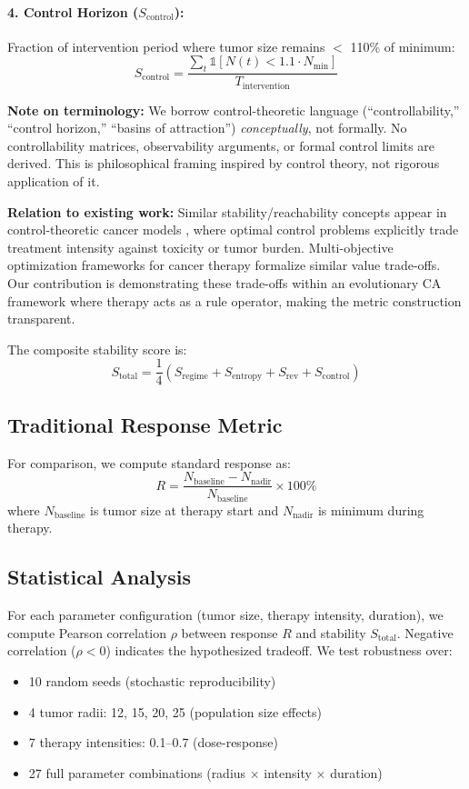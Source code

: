 \documentclass[11pt,a4paper]{article}
\begin{document}
\paragraph{4. Control Horizon ($S_{\text{control}}$):}
Fraction of intervention period where tumor size remains $<$ 110\% of minimum:
\[
S_{\text{control}} = \frac{\sum_t \mathbb{1}[N(t) < 1.1 \cdot N_{\text{min}}]}{T_{\text{intervention}}}
\]

\textbf{Note on terminology:} We borrow control-theoretic language (``controllability,'' ``control horizon,'' ``basins of attraction'') \textit{conceptually}, not formally. No controllability matrices, observability arguments, or formal control limits are derived. This is philosophical framing inspired by control theory, not rigorous application of it.

\textbf{Relation to existing work:} Similar stability/reachability concepts appear in control-theoretic cancer models \citep{carrere2020stability}, where optimal control problems explicitly trade treatment intensity against toxicity or tumor burden. Multi-objective optimization frameworks for cancer therapy \citep{stankova2020optimizing} formalize similar value trade-offs. Our contribution is demonstrating these trade-offs within an evolutionary CA framework where therapy acts as a rule operator, making the metric construction transparent.

The composite stability score is:
\[
S_{\text{total}} = \frac{1}{4}(S_{\text{regime}} + S_{\text{entropy}} + S_{\text{rev}} + S_{\text{control}})
\]

\subsection{Traditional Response Metric}

For comparison, we compute standard response as:
\[
R = \frac{N_{\text{baseline}} - N_{\text{nadir}}}{N_{\text{baseline}}} \times 100\%
\]
where $N_{\text{baseline}}$ is tumor size at therapy start and $N_{\text{nadir}}$ is minimum during therapy.

\subsection{Statistical Analysis}

For each parameter configuration (tumor size, therapy intensity, duration), we compute Pearson correlation $\rho$ between response $R$ and stability $S_{\text{total}}$. Negative correlation ($\rho < 0$) indicates the hypothesized tradeoff. We test robustness over:
\begin{itemize}
    \item 10 random seeds (stochastic reproducibility)
    \item 4 tumor radii: 12, 15, 20, 25 (population size effects)
    \item 7 therapy intensities: 0.1--0.7 (dose-response)
    \item 27 full parameter combinations (radius $\times$ intensity $\times$ duration)
\end{itemize}
\end{document}
